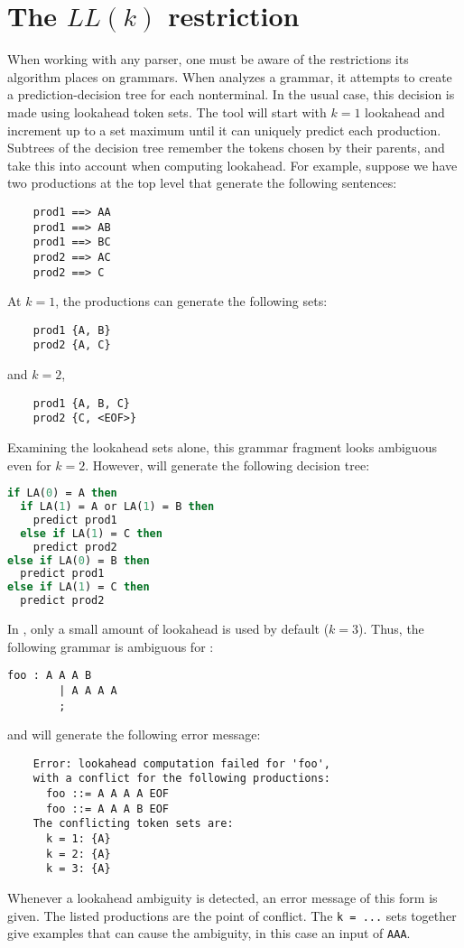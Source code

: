 \section{The $LL(k)$ restriction}\label{sec:antlr-llk}

When working with any parser, one must be aware of the restrictions its algorithm places on grammars.
When \antlr{} analyzes a grammar, it attempts to create a prediction-decision
tree for each nonterminal.
In the usual case, this decision is made using lookahead token sets.  The tool will start with $k = 1$
lookahead and increment up to a set maximum until it can
uniquely predict each production.  Subtrees of the decision tree
remember the tokens chosen by their parents, and take this into account
when computing lookahead.  For example, suppose we have two productions
at the top level that generate the following sentences:
\begin{verbatim}
    prod1 ==> AA
    prod1 ==> AB
    prod1 ==> BC
    prod2 ==> AC
    prod2 ==> C
\end{verbatim}
At $k = 1$, the productions can generate the following sets:
\begin{verbatim}
    prod1 {A, B}
    prod2 {A, C}
\end{verbatim}
and $k = 2$,
\begin{verbatim}
    prod1 {A, B, C}
    prod2 {C, <EOF>}
\end{verbatim}
Examining the lookahead sets alone, this grammar fragment looks ambiguous
even for $k = 2$.  However, \antlr{} will generate the following decision
tree:
\begin{lstlisting}[language=SML]
if LA(0) = A then
  if LA(1) = A or LA(1) = B then
    predict prod1
  else if LA(1) = C then
    predict prod2
else if LA(0) = B then
  predict prod1
else if LA(1) = C then
  predict prod2
\end{lstlisting}%

In \antlr{}, only a small amount of lookahead is used by default ($k = 3$).  Thus, the following grammar is ambiguous for \antlr{}:
\begin{lstlisting}[language=MLAntlr]
    foo : A A A B
        | A A A A
        ;
\end{lstlisting}%
and will generate the following error message:
\begin{verbatim}
    Error: lookahead computation failed for 'foo',
    with a conflict for the following productions:
      foo ::= A A A A EOF
      foo ::= A A A B EOF
    The conflicting token sets are:
      k = 1: {A}
      k = 2: {A}
      k = 3: {A}
\end{verbatim}
Whenever a lookahead ambiguity is detected, an error message of this form is given.  The listed productions are the point of conflict.
The \texttt{k = ...} sets together give examples that can cause the ambiguity, in this case an input of \texttt{AAA}.

